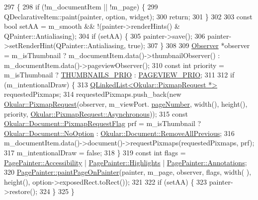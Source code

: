 \begin{DoxyCode}
297 \{
298     \textcolor{keywordflow}{if} (!m\_documentItem || !m\_page) \{
299         QDeclarativeItem::paint(painter, option, widget);
300         \textcolor{keywordflow}{return};
301     \}
302 
303     \textcolor{keyword}{const} \textcolor{keywordtype}{bool} setAA = m\_smooth && !(painter->renderHints() & QPainter::Antialiasing);
304     \textcolor{keywordflow}{if} (setAA) \{
305         painter->save();
306         painter->setRenderHint(QPainter::Antialiasing, \textcolor{keyword}{true});
307     \}
308 
309     \hyperlink{classObserver}{Observer} *observer = m\_isThumbnail ? m\_documentItem.data()->thumbnailObserver() : 
      m\_documentItem.data()->pageviewObserver();
310     \textcolor{keyword}{const} \textcolor{keywordtype}{int} priority = m\_isThumbnail ? \hyperlink{priorities_8h_ab16b32c0e27c1b356de608b808b17736}{THUMBNAILS\_PRIO} : 
      \hyperlink{priorities_8h_a0131e2e939bdcd26243b1406c3b924d6}{PAGEVIEW\_PRIO};
311 
312     \textcolor{keywordflow}{if} (m\_intentionalDraw) \{
313         \hyperlink{classQLinkedList}{QLinkedList<Okular::PixmapRequest *>} requestedPixmaps;
314         requestedPixmaps.push\_back(\textcolor{keyword}{new} \hyperlink{classOkular_1_1PixmapRequest}{Okular::PixmapRequest}(observer, m\_viewPort.
      \hyperlink{classOkular_1_1DocumentViewport_a122674d4a493e79b1aa5fd5c00e81c93}{pageNumber}, width(), height(), priority, 
      \hyperlink{classOkular_1_1PixmapRequest_a34c6774277612c3af3743fdd44ab0cbaa1c086a3111f9332b7a0b6d8ff0ab967f}{Okular::PixmapRequest::Asynchronous}));
315         \textcolor{keyword}{const} \hyperlink{classOkular_1_1Document_a34c1f67c024cfbdd46379c5fac3674d7}{Okular::Document::PixmapRequestFlag} prf = m\_isThumbnail ? 
      \hyperlink{classOkular_1_1Document_a34c1f67c024cfbdd46379c5fac3674d7a87c3cee454d9bacfd7e9642eb697abb0}{Okular::Document::NoOption} : 
      \hyperlink{classOkular_1_1Document_a34c1f67c024cfbdd46379c5fac3674d7a3e895c552ec2119c4a743aaefa3d00af}{Okular::Document::RemoveAllPrevious};
316         m\_documentItem.data()->document()->requestPixmaps(requestedPixmaps, prf);
317         m\_intentionalDraw = \textcolor{keyword}{false};
318     \}
319     \textcolor{keyword}{const} \textcolor{keywordtype}{int} flags = \hyperlink{classPagePainter_ae7f51ac72a598d2753cfc35ecdb51e01ac3c6879723c19935fb6fe250d0feca17}{PagePainter::Accessibility} | 
      \hyperlink{classPagePainter_ae7f51ac72a598d2753cfc35ecdb51e01a3582deaa27eb857b1bbdd54e6174b3b5}{PagePainter::Highlights} | \hyperlink{classPagePainter_ae7f51ac72a598d2753cfc35ecdb51e01a87c63f97188bb13cbafd5ae63be3fe40}{PagePainter::Annotations};
320     \hyperlink{classPagePainter_a5eea3c770160bf6b62f36ef802b5bd25}{PagePainter::paintPageOnPainter}(painter, m\_page, observer, flags, width(
      ), height(), option->exposedRect.toRect());
321 
322     \textcolor{keywordflow}{if} (setAA) \{
323         painter->restore();
324     \}
325 \}
\end{DoxyCode}
